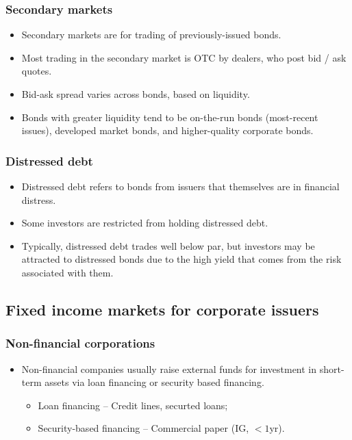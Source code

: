 \documentclass[../notes_compiled.tex]{subfiles}
\begin{document}
\subsubsection*{Secondary markets}
\begin{itemize}
\item[] Secondary markets are for trading of previously-issued bonds.
\item Most trading in the secondary market is OTC by dealers, who post bid / ask quotes.
\item Bid-ask spread varies across bonds, based on liquidity.
\item Bonds with greater liquidity tend to be on-the-run bonds (most-recent issues), developed market bonds, and higher-quality corporate bonds.
\end{itemize}

\subsubsection*{Distressed debt}
\begin{itemize}
\item Distressed debt refers to bonds from issuers that themselves are in financial distress.
\item Some investors are restricted from holding distressed debt.
\item Typically, distressed debt trades well below par, but investors may be attracted to distressed bonds due to the high yield that comes from the risk associated with them.
\end{itemize}

\subsection{Fixed income markets for corporate issuers}
\subsubsection{Non-financial corporations}
\begin{itemize}
\item Non-financial companies usually raise external funds for investment in short-term assets via loan financing or security based financing.
\begin{itemize}
\item Loan financing -- Credit lines, securted loans;
\item Security-based financing -- Commercial paper (IG, $<1$yr).
\end{itemize}
\end{itemize}
\end{document}
